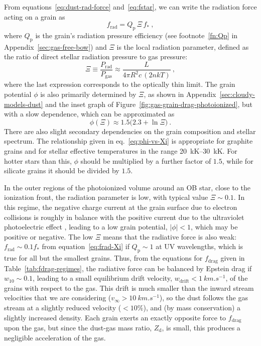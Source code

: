 \message{ !name(dusty-bow-wave.tex)}\documentclass[useAMS, usenatbib, a4paper]{mnras}
\providecommand{\abs}[1]{\lvert#1\rvert}
\newcommand\Qp{\ensuremath{Q_{\text{p}}}}
\newcommand{\grain}{\ensuremath{_{\text{d}}}}
\newcommand\drag{\ensuremath{_{\text{drag}}}}
\newcommand{\gas}{\ensuremath{_{\text{gas}}}}
\newcommand{\drift}{\ensuremath{_{\text{drift}}}}
\newcommand\rad{\ensuremath{_{\text{rad}}}}
\begin{document}
From equations~\eqref{eq:dust-rad-force} and~\eqref{eq:fstar}, we can
write the radiation force acting on a grain as
\begin{equation}
  \label{eq:frad-Xi}
  f\rad = \Qp\, \Xi\, f_* \ ,
\end{equation}
where \(\Qp\) is the grain's radiation pressure efficiency (see
footnote~\ref{fn:Qp} in Appendix~\ref{sec:gas-free-bow}) and \(\Xi\) is
the local radiation parameter, defined as the ratio of direct stellar
radiation pressure to gas pressure:
\begin{equation}
  \label{eq:Xi-Prad-over-Pgas}
  \Xi \equiv \frac{P\rad}{P\gas} \approx \frac{L}{4 \pi R^2 c\, (2 n k T)} \ ,
\end{equation}
where the last expression corresponds to the optically thin limit.
The grain potential \(\phi\) is also primarily determined by \(\Xi\), as
shown in Appendix~\ref{sec:cloudy-models-dust} and the inset graph of
Figure~\ref{fig:gas-grain-drag-photoionized}, but with a slow
dependence, which can be approximated as
\begin{equation}
  \label{eq:phi-vs-Xi}
  \phi(\Xi) \approx 1.5 \bigl( 2.3 +  \ln \Xi \bigr) \ .
\end{equation}
There are also slight secondary dependencies on the grain composition and
stellar spectrum.  The relationship given in eq.~\eqref{eq:phi-vs-Xi}
is appropriate for graphite grains and for stellar effective
temperatures in the range \SIrange{20}{30}{kK}.  For hotter stars than
this, \(\phi\) should be multiplied by a further factor of \(1.5\), while
for silicate grains it should be divided by \(1.5\).

In the outer regions of the photoionized volume around an OB star,
close to the ionization front, the radiation parameter is low, with
typical value \(\Xi \sim 0.1\).  In this regime, the negative charge
current at the grain surface due to electron collisions is roughly in
balance with the positive current due to the ultraviolet photoelectric
effect \citep{Weingartner:2001b}, leading to a low grain potential,
\(\abs{\phi} < 1\), which may be positive or negative.  The low
\(\Xi\) means that the radiative force is also weak:
\(f\rad \sim 0.1 f_*\) from equation~\eqref{eq:frad-Xi} if
\(\Qp \sim 1\) at UV wavelengths, which is true for all but the smallest
grains.  Thus, from the equations for \(f\drag\) given in
Table~\ref{tab:fdrag-regimes}, the radiative force can be balanced by
Epstein drag if \(w_{10} \sim 0.1\), leading to a small equilibrium drift
velocity, \(w\drift < \SI{1}{km.s^{-1}}\), of the grains with respect
to the gas.  This drift is much smaller than the inward stream
velocities that we are considering
(\(v_\infty > \SI{10}{km.s^{-1}}\)), so the dust follows the gas stream at
a slightly reduced velocity (\(< 10\%\)), and (by mass conservation) a
slightly increased density.  Each grain exerts an exactly opposite
force to \(f\drag\) upon the gas, but since the dust-gas mass ratio,
\(Z\grain\), is small, this produces a negligible acceleration of the
gas.
\end{document}
